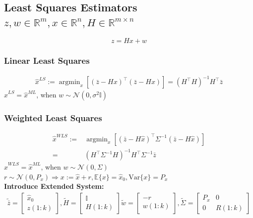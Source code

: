 \subsection{Least Squares Estimators $z,w \in \mathbb{R}^m, x \in \mathbb{R}^n, H \in \mathbb{R}^{m \times n}$}
\begin{equation*}
    z = Hx + w
\end{equation*}
\subsubsection{Linear Least Squares }

\begin{align*}
    \widehat{x}^{LS} := \mathop{\mathrm{argmin}}_{x}
    \left[(\bar{z}-Hx)^\top (\bar{z}-Hx)\right] = (H^\top H)^{-1} H^\top \bar{z}
\end{align*}
$\hat{x}^{LS} = \hat{x}^{ML}$, when $w \sim \mathcal{N}(0, \sigma^2 \mathbb{I})$

\subsubsection{Weighted Least Squares}
\begin{align*}
    \widehat{x}^{WLS} 
    :=& \textstyle\mathop{\mathrm{argmin}}_{x} 
    \left[ (\bar{z} \!-\! H \widehat{x})^\top 
    \Sigma^{-1} (\bar{z} \!-\! H \widehat{x}) \right] \\
    =& (H^\top \Sigma^{-1} H)^{-1} H^\top \Sigma^{-1} \bar{z}
\end{align*}
$\hat{x}^{WLS} = \hat{x}^{ML}$, when $w \sim \mathcal{N}(0, \Sigma)$\\

$r\sim\mathcal{N}(0,P_x) \Rightarrow x := \widehat{x} + r, \mathbb{E}\{x\} = \widehat{x}_0, \mathrm{Var}\{x\} = P_x$ \\
\textbf{Introduce Extended System:}
\begin{align*}
    \tilde{\bar{z}} = \left[ \begin{smallmatrix}
        \widehat{x}_0 \\
        z(1:k)
    \end{smallmatrix} \right],
    \tilde{H} = \left[ \begin{smallmatrix}
        \mathbb{I} \\
        H(1:k)
    \end{smallmatrix} \right]
    \tilde{w} = \left[ \begin{smallmatrix}
        -r \\
        w(1:k)
    \end{smallmatrix} \right],
    \tilde{\Sigma}= \left[ \begin{smallmatrix}
        P_x & 0 \\
        0 & R(1:k)
    \end{smallmatrix} \right]
\end{align*}
\vfil\null\columnbreak

